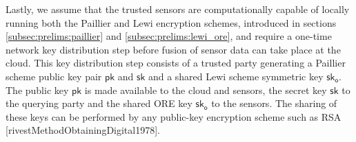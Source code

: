 Lastly, we assume that the trusted sensors are computationally capable of locally running both the Paillier and Lewi encryption schemes, introduced in sections \ref{subsec:prelims:paillier} and \ref{subsec:prelims:lewi_ore}, and require a one-time network key distribution step before fusion of sensor data can take place at the cloud. This key distribution step consists of a trusted party generating a Paillier scheme public key pair $\mathsf{pk}$ and $\mathsf{sk}$ and a shared Lewi scheme symmetric key $\mathsf{sk}_{\mathsf{o}}$. The public key $\mathsf{pk}$ is made available to the cloud and sensors, the secret key $\mathsf{sk}$ to the querying party and the shared ORE key $\mathsf{sk}_{\mathsf{o}}$ to the sensors. The sharing of these keys can be performed by any public-key encryption scheme such as RSA [rivestMethodObtainingDigital1978].

% 
% 

